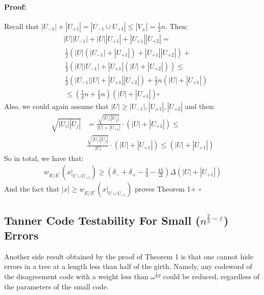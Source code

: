 \documentclass{article}
\begin{document}
\begin{multicols*}{2}
\paragraph{Proof:} Recall that $ |U_{-1}| + |U_{+1}| =  |U_{-1} \cup U_{+1} | \le | V_{\pm} | = \frac{1}{2}n $. Then:  
\begin{equation*}
  \begin{split}
    & |U||U_{-1}| + |U||U_{+1}| + |U_{+1}||U_{+2}|  = \\
    & \  \frac{1}{2}\left( |U|(|U_{-1}| + |U_{+1}|) + |U_{+1}||U_{+2}|  \right) + \\ 
    & \  \frac{1}{2}\left( |U||U_{-1}| + |U_{+1}|(|U| + |U_{+2}|)  \right) \le \\ 
    & \ \frac{1}{2}\left( |U_{-1}||U| + |U_{+1}||U_{+2}|  \right) + \frac{1}{2}n\left( |U| +|U_{+1}| \right) \\ 
    & \ \le \left( \frac{1}{4}n + \frac{1}{2}n \right) \left( |U| + |U_{+1}|  \right) \square 
  \end{split}
\end{equation*}
Also, we could again assume that $|U| \ge |U_{-1}|,|U_{+1}|,|U_{+2}|$ and then:
\begin{equation*}
  \begin{split}
    \sqrt{|U_{i}||U_{j}|} & = \frac{\sqrt{|U_{i}||U_{j}|}}{|U|+|U_{+1}|}\cdot \left( |U| + |U_{+1}| \right) \le \\ &   \frac{\sqrt{|U_{i}||U_{j}|}}{|U|}\cdot \left( |U| + |U_{+1}| \right)  
	 \le \left( |U| + |U_{+1}| \right)
  \end{split}
\end{equation*}
So in total, we have that: 
\begin{equation*}
  \begin{split}
    w_{E/E^{\prime}}\left( x|_{U\cup U_{+1}} \right) \ge   \left( \delta_{-}+\delta_{+} - \frac{3}{4} - \frac{4\lambda}{\Delta} \right)\Delta\left( |U|+|U_{+1}| \right)
  \end{split}
\end{equation*}
And the fact that $|x| \ge w_{E/E^{\prime}}\left( x|_{U\cup U_{+1}} \right) $ proves Theorem 1+ $\square$

\subsection{ Tanner Code Testability For Small ($n^{\frac{2}{3}-\varepsilon}$) Errors}
Another side result obtained by the proof of Theorem 1 is that one cannot hide errors in a tree at a length less than half of the girth. Namely, any codeword of the disagreement code with a weight less than $ \omega^{\frac{1}{2}g} $ could be reduced, regardless of the parameters of the small code. 

\end{multicols*}
\end{document}

